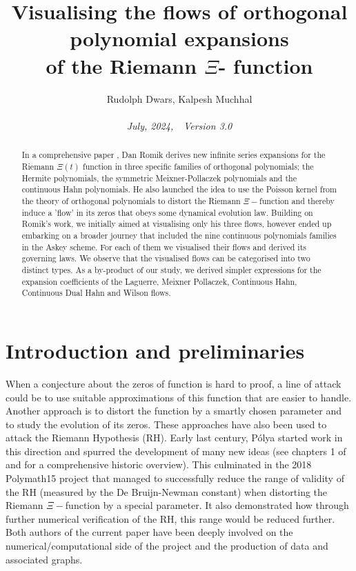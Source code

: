 \documentclass[a4paper,11pt,twoside]{amsart}
\title[Visualising the flows of orthogonal polynomial expansions of the Riemann $\Xi$-function]{Visualising the flows of orthogonal polynomial expansions \\ of the Riemann $\Xi$- function}
\author{Rudolph Dwars, Kalpesh Muchhal\\ \\ \textit{July, 2024,  \,\, Version 3.0}}
\begin{document}
\begin{abstract}
In a comprehensive paper \cite{rom}, Dan Romik derives new infinite series expansions for the Riemann $\Xi(t)$ function in three specific families of orthogonal polynomials; the Hermite polynomials, the symmetric Meixner-Pollaczek polynomials and the continuous Hahn polynomials. He also launched the idea to use the Poisson kernel from the theory of orthogonal polynomials to distort the Riemann $\Xi-$function and thereby induce a 'flow' in its zeros that obeys some dynamical evolution law. Building on Romik's work, we initially aimed at visualising only his three flows, however ended up embarking on a broader journey that included the nine continuous polynomials families in the Askey scheme. For each of them we visualised their flows and derived its governing laws. We observe that the visualised flows can be categorised into two distinct types. As a by-product of our study, we derived simpler expressions for the expansion coefficients of the Laguerre, Meixner Pollaczek, Continuous Hahn, Continuous Dual Hahn and Wilson flows.  
\end{abstract}

\maketitle

\section{Introduction and preliminaries}

When a conjecture about the zeros of function is hard to proof, a line of attack could be to use suitable approximations of this function that are easier to handle. Another approach is to distort the function by a smartly chosen parameter and to study the evolution of its zeros. These approaches have also been used to attack the Riemann Hypothesis (RH). Early last century, Pólya started work in this direction and spurred the development of many new ideas (see chapters 1 of \cite{rom} and \cite{pol} for a comprehensive historic overview). This culminated in the 2018 Polymath15 project \cite{pol} that managed to successfully reduce the range of validity of the RH (measured by the De Bruijn-Newman constant) when distorting the Riemann $\Xi-$function by a special parameter. It also demonstrated how through further numerical verification of the RH, this range would be reduced further. Both authors of the current paper have been deeply involved on the numerical/computational side of the project and the production of data and associated graphs. 
\end{document}
